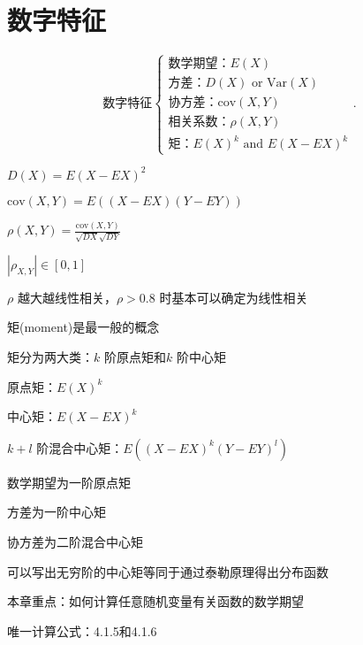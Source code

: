 \section{数字特征}%
\label{sec:数字特征}
\[
    \text{数字特征}\begin{cases}
        \text{数学期望：}E\left( X \right) \\
        \text{方差：}D\left( X \right) \text{ or }\mathrm{Var}\left( X \right) \\
        \text{协方差：}\mathrm{cov}\left( X,Y \right) \\
        \text{相关系数：}\rho\left( X,Y \right) \\
        \text{矩：}E\left( X \right) ^{k} \text{ and } E\left( X-EX \right) ^{k}
    \end{cases}
.\] 
\begin{notation}
    $D\left( X \right) =E\left( X-EX \right) ^2$ 

    $\text{cov}\left( X,Y \right) =E\left( \left( X-EX \right) \left( Y-EY \right)  \right) $

    $ \rho\left( X,Y \right) ={\frac{\text{cov}\left( X,Y \right) }{\sqrt{DX} \sqrt{DY} }}$
\end{notation}
\begin{notation}
    $|\rho_{X,Y}|\in [0,1]$ 
    
    $\rho$ 越大越线性相关，$\rho>0.8$ 时基本可以确定为线性相关
\end{notation}
\begin{notation}
    矩(moment)是最一般的概念

    矩分为两大类：$k$ 阶原点矩和$k$ 阶中心矩

    原点矩：$E\left( X \right) ^{k}$

    中心矩：$E\left( X-EX \right) ^{k}$

    $k+l$ 阶混合中心矩：$E\left( \left( X-EX \right) ^{k}\left( Y-EY \right) ^{l} \right) $
\end{notation}
\begin{eg}
    数学期望为一阶原点矩

    方差为一阶中心矩

    协方差为二阶混合中心矩
\end{eg}
\begin{notation}
    可以写出无穷阶的中心矩等同于通过泰勒原理得出分布函数
    
    本章重点：如何计算任意随机变量有关函数的数学期望

    唯一计算公式：4.1.5和4.1.6
\end{notation}

